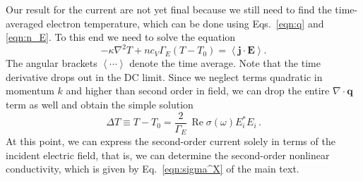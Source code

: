 \documentclass[aps, prb, reprint, superscriptaddress]{revtex4-2}
\DeclareMathOperator{\re}{Re}
\renewcommand{\vec}{\mathbf}
\begin{document}
Our result for the current are not yet final because we still need to 
find the time-averaged electron temperature, which can be done using Eqs.~\eqref{eqn:q} and \eqref{eqn:n_E}.  
To this end we need to solve the equation
\begin{equation}
	-\kappa \nabla^2 T + n c_V \Gamma_E  (T - T_0)
	= \left\langle \vec{j}\cdot\vec{E} \right\rangle.
	\label{eqn:temp_hydro}
\end{equation} 
The angular brackets $\left\langle \cdots \right\rangle$ denote the time average.
Note that the time derivative drops out in the DC limit.
Since we neglect terms quadratic in momentum $k$ and higher than second order in field, we can drop the entire $\nabla \cdot \vec{q}$ term as well
and obtain the simple solution
\begin{equation}
	\Delta T \equiv T - T_0 = \frac{2}{\Gamma_E}\, \re \sigma(\omega) E_i^* E_i\,.
	\label{eqn:T_simple}
\end{equation} 
At this point, we can express the second-order current solely in terms of the incident electric field,
that is, we can determine the second-order nonlinear conductivity, which is given by Eq.~\eqref{eqn:sigma^X} of the main text.  

\end{document}
